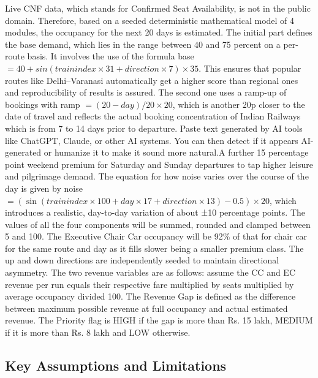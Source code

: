 \documentclass[10pt,a4paper]{article}
\begin{document}
Live CNF data, which stands for Confirmed Seat Availability, is not in the public domain.
Therefore, based on a seeded deterministic mathematical model of 4 modules, the occupancy
for the next 20 days is estimated. The initial part defines the base demand, which lies in the
range between 40 and 75 percent on a per-route basis. It involves the use of the formula base
$= 40 + sin(train index \times 31 + direction \times 7) \times 35$. This ensures that popular routes like
Delhi–Varanasi automatically get a higher score than regional ones and reproducibility of
results is assured. The second one uses a ramp-up of bookings with ramp $= (20 - day)/20 \times 20$,
which is another 20p closer to the date of travel and reflects the actual booking concentration
of Indian Railways which is from 7 to 14 days prior to departure. Paste text generated by AI
tools like ChatGPT, Claude, or other AI systems. You can then detect if it appears AI-generated
or humanize it to make it sound more natural.A further 15 percentage point weekend premium
for Saturday and Sunday departures to tap higher leisure and pilgrimage demand. The equation
for how noise varies over the course of the day is given by noise $= (\sin(train index \times 100 + day
\times 17 + direction \times 13) - 0.5) \times 20$, which introduces a realistic, day-to-day variation of about
±10 percentage points. The values of all the four components will be summed, rounded and
clamped between 5 and 100. The Executive Chair Car occupancy will be 92\% of that for chair
car for the same route and day as it fills slower being a smaller premium class. The up and down
directions are independently seeded to maintain directional asymmetry. The two revenue
variables are as follows: assume the CC and EC revenue per run equals their respective fare
multiplied by seats multiplied by average occupancy divided 100. The Revenue Gap is defined
as the difference between maximum possible revenue at full occupancy and actual estimated
revenue. The Priority flag is HIGH if the gap is more than Rs. 15 lakh, MEDIUM if it is more
than Rs. 8 lakh and LOW otherwise.

\subsection{Key Assumptions and Limitations}
\end{document}
